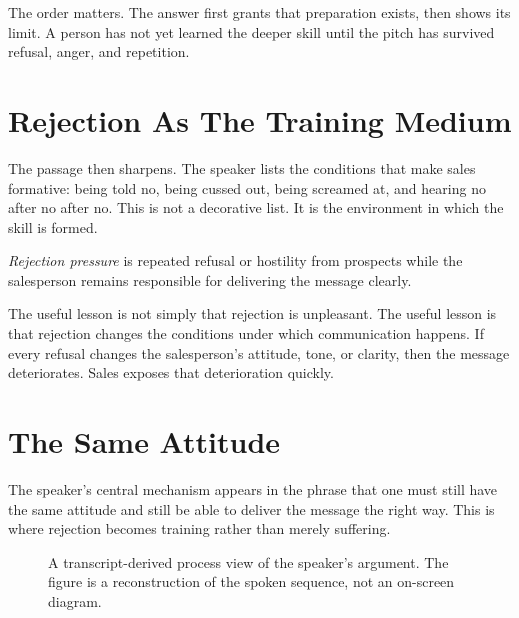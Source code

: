 The order matters. The answer first grants that preparation exists, then shows its limit. A person has not yet learned the deeper skill until the pitch has survived refusal, anger, and repetition.

\section{Rejection As The Training Medium}

The passage then sharpens. The speaker lists the conditions that make sales formative: being told no, being cussed out, being screamed at, and hearing no after no after no. This is not a decorative list. It is the environment in which the skill is formed.

\begin{definition}
\emph{Rejection pressure} is repeated refusal or hostility from prospects while the salesperson remains responsible for delivering the message clearly.
\end{definition}

The useful lesson is not simply that rejection is unpleasant. The useful lesson is that rejection changes the conditions under which communication happens. If every refusal changes the salesperson's attitude, tone, or clarity, then the message deteriorates. Sales exposes that deterioration quickly.

\section{The Same Attitude}

The speaker's central mechanism appears in the phrase that one must still have the same attitude and still be able to deliver the message the right way. This is where rejection becomes training rather than merely suffering.

\begin{figure}
\centering
{}
\caption{A transcript-derived process view of the speaker's argument. The figure is a reconstruction of the spoken sequence, not an on-screen diagram.}
\end{figure}

